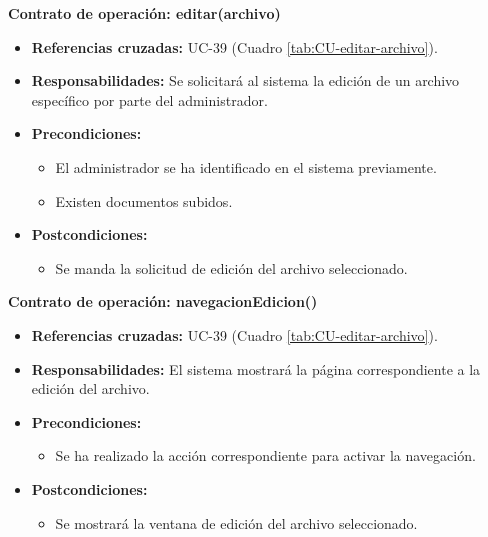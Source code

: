\textbf{Contrato de operación: editar(archivo)}
\begin{itemize}
\item \textbf{Referencias cruzadas:} UC-39 (Cuadro \ref{tab:CU-editar-archivo}).
\item \textbf{Responsabilidades:} Se solicitará al sistema la edición de un archivo específico por parte del administrador.
\item \textbf{Precondiciones:} 
 \begin{itemize}
\item El administrador se ha identificado en el sistema previamente.
\item Existen documentos subidos.
\end {itemize}
\item \textbf{Postcondiciones:} 
 \begin{itemize}
\item Se manda la solicitud de edición del archivo seleccionado.
\end {itemize}
\end {itemize}

\textbf{Contrato de operación: navegacionEdicion()}
\begin{itemize}
\item \textbf{Referencias cruzadas:} UC-39 (Cuadro \ref{tab:CU-editar-archivo}).
\item \textbf{Responsabilidades:} El sistema mostrará la página correspondiente a la edición del archivo.
\item \textbf{Precondiciones:} 
 \begin{itemize}
\item Se ha realizado la acción correspondiente para activar la navegación.
\end {itemize}
\item \textbf{Postcondiciones:} 
 \begin{itemize}
\item Se mostrará la ventana de edición del archivo seleccionado.
\end {itemize}
\end {itemize}

